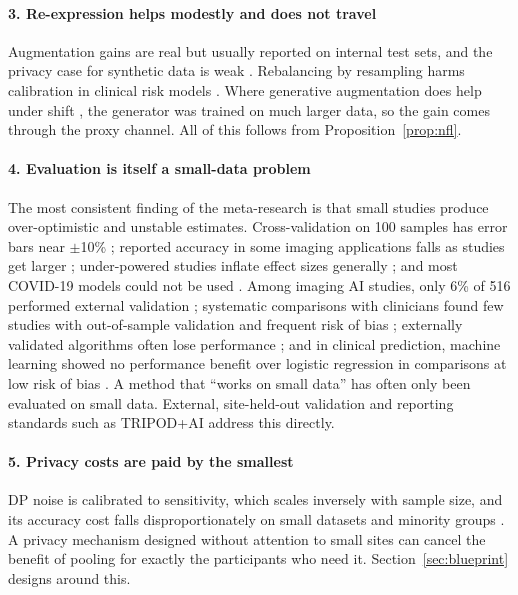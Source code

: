 \documentclass[acmsmall,screen,review]{acmart}
\theoremstyle{acmdefinition}
\begin{document}
\paragraph{3. Re-expression helps modestly and does not travel} Augmentation gains are real but usually reported on internal test sets, and the privacy case for synthetic data is weak \cite{stadler2022synthetic}. Rebalancing by resampling harms calibration in clinical risk models \cite{goorbergh2022harm}. Where generative augmentation does help under shift \cite{ktena2024generative}, the generator was trained on much larger data, so the gain comes through the proxy channel. All of this follows from Proposition~\ref{prop:nfl}.

\paragraph{4. Evaluation is itself a small-data problem} The most consistent finding of the meta-research is that small studies produce over-optimistic and unstable estimates. Cross-validation on 100 samples has error bars near $\pm$10\% \cite{varoquaux2018cross}; reported accuracy in some imaging applications falls as studies get larger \cite{varoquaux2022machine}; under-powered studies inflate effect sizes generally \cite{button2013power,ioannidis2005most}; and most COVID-19 models could not be used \cite{roberts2021common,wynants2020prediction}. Among imaging AI studies, only 6\% of 516 performed external validation \cite{kim2019design}; systematic comparisons with clinicians found few studies with out-of-sample validation and frequent risk of bias \cite{liu2019comparison,nagendran2020artificial}; externally validated algorithms often lose performance \cite{yu2022external}; and in clinical prediction, machine learning showed no performance benefit over logistic regression in comparisons at low risk of bias \cite{christodoulou2019systematic}. A method that ``works on small data'' has often only been evaluated on small data. External, site-held-out validation and reporting standards such as TRIPOD+AI \cite{collins2024tripod} address this directly.

\paragraph{5. Privacy costs are paid by the smallest} DP noise is calibrated to sensitivity, which scales inversely with sample size, and its accuracy cost falls disproportionately on small datasets and minority groups \cite{bagdasaryan2019differential,tramer2021differentially}. A privacy mechanism designed without attention to small sites can cancel the benefit of pooling for exactly the participants who need it. Section~\ref{sec:blueprint} designs around this.
\end{document}
